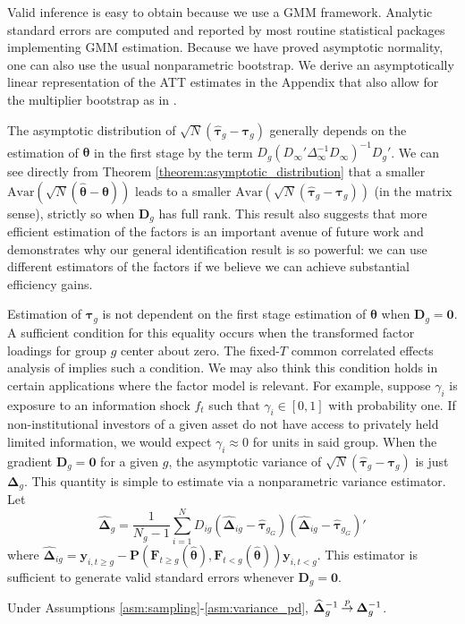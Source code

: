 \documentclass[12pt]{article}
\begin{document}
Valid inference is easy to obtain because we use a GMM framework. Analytic standard errors are computed and reported by most routine statistical packages implementing GMM estimation. Because we have proved asymptotic normality, one can also use the usual nonparametric bootstrap. We derive an asymptotically linear representation of the ATT estimates in the Appendix that also allow for the multiplier bootstrap as in \citet{Callaway_Karami_2020}. 

The asymptotic distribution of $\sqrt{N}(\widehat{\bm \tau}_g - \bm \tau_{g})$ generally depends on the estimation of $\bm{\theta}$ in the first stage by the term $D_g (D_\infty' \Delta_\infty^{-1} D_\infty)^{-1} D_g'$. We can see directly from Theorem \ref{theorem:asymptotic_distribution} that a smaller $\text{Avar}(\sqrt{N}(\widehat{\bm{\theta}} - \bm{\theta}))$ leads to a smaller $\text{Avar}(\sqrt{N}(\widehat{\bm \tau}_g - \bm \tau_g))$ (in the matrix sense), strictly so when $\bm D_g$ has full rank. This result also suggests that more efficient estimation of the factors is an important avenue of future work and demonstrates why our general identification result is so powerful: we can use different estimators of the factors if we believe we can achieve substantial efficiency gains. 

Estimation of $\bm \tau_g$ is not dependent on the first stage estimation of $\bm{\theta}$ when $\bm D_g = \bm 0$. A sufficient condition for this equality occurs when the transformed factor loadings for group $g$ center about zero. The fixed-$T$ common correlated effects analysis of \citet{Westerlund_Petrova_Norkute_2019} implies such a condition. We may also think this condition holds in certain applications where the factor model is relevant. For example, suppose $\gamma_i$ is exposure to an information shock $f_t$ such that $\gamma_i \in [0,1]$ with probability one. If non-institutional investors of a given asset do not have access to privately held limited information, we would expect $\gamma_i \approx 0$ for units in said group. When the gradient $\bm D_g = \bm 0$ for a given $g$, the asymptotic variance of $\sqrt{N}(\widehat{\bm \tau}_g - \bm \tau_g)$ is just $\bm \Delta_g$. This quantity is simple to estimate via a nonparametric variance estimator. Let 
\begin{equation}\label{eq:nonparametric_variance}
  \widehat{\bm \Delta}_g = \frac{1}{N_g - 1} \sum_{i = 1}^N D_{ig} \left( \widehat{\bm \Delta}_{ig} - \widehat{\bm \tau}_{g_G} \right) \left( \widehat{\bm \Delta}_{ig} - \widehat{\bm \tau}_{g_G} \right)'
\end{equation}
where $\widehat{\bm \Delta}_{ig} = \bm y_{i, t \geq g} - \bm P(\bm{F}_{t \geq g}(\widehat{\bm{\theta}}), \bm{F}_{t < g}(\widehat{\bm{\theta}})) \bm y_{i, t < g}$. This estimator is sufficient to generate valid standard errors whenever $\bm D_g = \bm 0$.
\begin{theorem}\label{theorem:nonparametric_variance}
  Under Assumptions \ref{asm:sampling}-\ref{asm:variance_pd}, $\widehat{\bm \Delta}_g^{-1} \mathbin{\overset{p}{\to}} \bm \Delta_g^{-1}$.
\end{theorem}
\end{document}
